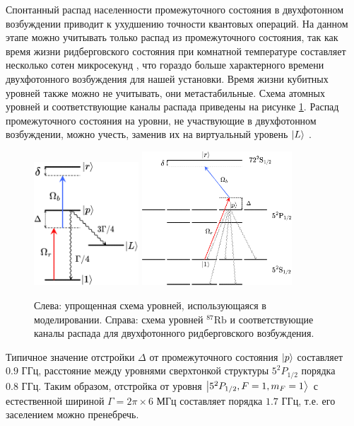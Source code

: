Спонтанный распад населенности промежуточного состояния в двухфотонном возбуждении приводит к ухудшению точности квантовых операций. На данном этапе можно учитывать только распад из промежуточного состояния, так как время жизни ридберговского состояния при комнатной температуре составляет несколько сотен микросекунд \cite{Ryabtsev_BBR}, что гораздо больше характерного времени двухфотонного возбуждения для нашей установки. Время жизни кубитных уровней также можно не учитывать, они метастабильные. Схема атомных уровней и соответствующие каналы распада приведены на рисунке \ref{fig:atom_scheme}. Распад промежуточного состояния на уровни, не участвующие в двухфотонном возбуждении, можно учесть, заменив их на виртуальный уровень $\left| L \right\rangle$ \cite{Browayes}.

\begin{figure}[ht]
	\centering
	\includegraphics[width=0.35\textwidth]{images/ModelScheme.pdf}
	\hspace{2em}
	\includegraphics[width=0.5\textwidth]{images/AtomScheme.pdf}
	\caption{Слева: упрощенная схема уровней, использующаяся в моделировании. Справа: схема уровней $^{87}\text{Rb}$ и соответствующие каналы распада для двухфотонного ридберговского возбуждения.}
	\label{fig:atom_scheme}
\end{figure}

Типичное значение отстройки $\Delta$ от промежуточного состояния $\left| p \right\rangle$ составляет $0.9 \text{ ГГц}$, расстояние между уровнями сверхтонкой структуры $5^2P_{1/2}$ порядка $0.8 \text{ ГГц}$. Таким образом, отстройка от уровня $\left| 5^2P_{1/2},F=1,m_F=1 \right\rangle$ с естественной шириной $\Gamma= 2\pi \times 6 \text{ МГц}$ составляет порядка $1.7 \text{ ГГц}$, т.е. его заселением можно пренебречь. 

